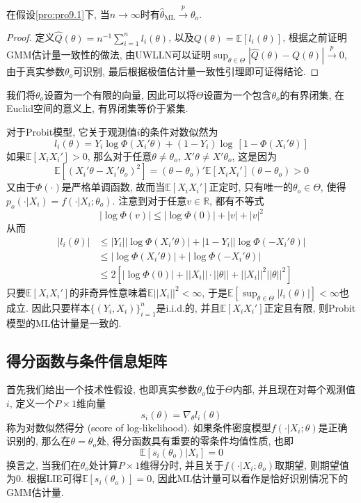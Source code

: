 \documentclass[cn, 12pt, math=mtpro2, bibstyle=apa, blue, twocol]{elegantbook}
\newcommand{\R}{\mathbb{R}}
\newcommand{\E}{\mathbb{E}}
\begin{document}
\begin{theorem}
在假设\ref{pro:pro9.1}下, 当$n\to\infty$时有$\hat{\theta}_\text{ML}\xrightarrow{p}\theta_o$.
\end{theorem}
\begin{proof}
  定义$\hat{Q}(\theta)=n^{-1}\sum_{i=1}^{n} l_i(\theta)$, 以及$Q(\theta)=\E[ l_i(\theta)]$, 根据之前证明GMM估计量一致性的做法, 由UWLLN可以证明$\sup_{\theta\in\Theta}|\hat{Q}(\theta)-Q(\theta)|\xrightarrow{p}0$, 由于真实参数$\theta_o$可识别, 最后根据极值估计量一致性引理即可证得结论.
\end{proof}

我们将$\theta_o$设置为一个有限的向量, 因此可以将$\Theta$设置为一个包含$\theta_o$的有界闭集, 在Euclid空间的意义上, 有界闭集等价于紧集.

对于Probit模型, 它关于观测值$i$的条件对数似然为
$$l_i(\theta)=Y_i\log\Phi(X_i'\theta)+(1-Y_i)\log\,[1-\Phi(X_i'\theta)]$$
如果$\E[X_iX_i']>0$, 那么对于任意$\theta\neq\theta_o$, $X'\theta\neq X'\theta_o$, 这是因为
$$\E[(X_i'\theta-X_i'\theta_o)^2]=(\theta-\theta_o)'\E[X_iX_i'](\theta-\theta_o)>0$$
又由于$\Phi(\cdot)$是严格单调函数, 故而当$\E[X_iX_i']$正定时, 只有唯一的$\theta_o\in\Theta$, 使得$p_o(\cdot|X_i)=f(\cdot|X_i;\theta_o)$. 注意到对于任意$v\in\R$, 都有不等式
$$|\log \Phi(v)|\leq |\log\Phi(0)|+|v|+|v|^2$$
从而
\begin{align*}
|l_i(\theta)| &\leq |Y_i||\log \Phi(X_i'\theta)|+|1-Y_i||\log\Phi(-X_i'\theta)| \\
&\leq |\log \Phi(X_i'\theta)|+|\log \Phi(-X_i'\theta)| \\
&\leq 2[|\log\Phi(0)|+||X_i||\cdot||\theta||+||X_i||^2||\theta||^2]
\end{align*}
只要$\E[X_iX_i']$的非奇异性意味着$\E||X_i||^2<\infty$, 于是$\E[\sup_{\theta\in\Theta}|l_i(\theta)|]<\infty$也成立. 因此只要样本$\{(Y_i,X_i)\}_{i=1}^n$是i.i.d.的, 并且$\E[X_iX_i']$正定且有限, 则Probit模型的ML估计量是一致的.
\subsection{得分函数与条件信息矩阵}
首先我们给出一个技术性假设, 也即真实参数$\theta_o$位于$\Theta$内部, 并且现在对每个观测值$i$, 定义一个$P\times1$维向量
$$s_i(\theta)=\nabla_\theta l_i(\theta)$$
称为对数似然得分 (score of log-likelihood). 如果条件密度模型$f(\cdot|X_i;\theta)$是正确识别的, 那么在$\theta=\theta_o$处, 得分函数具有重要的零条件均值性质, 也即
\begin{equation}\label{eq9.10}
  \E[s_i(\theta_o)|X_i]=0
\end{equation}
换言之, 当我们在$\theta_o$处计算$P\times1$维得分时, 并且关于$f(\cdot|X_i;\theta_o)$取期望, 则期望值为0. 根据LIE可得$\E[s_i(\theta_o)]=0$, 因此ML估计量可以看作是恰好识别情况下的GMM估计量.
\end{document}
